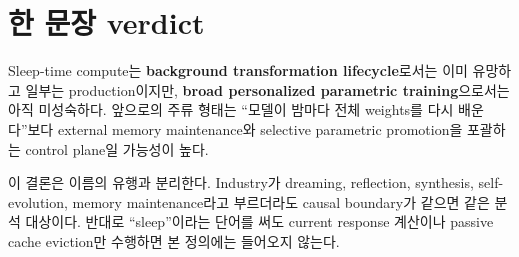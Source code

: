 \section{한 문장 verdict}

\begin{keypoint}
Sleep-time compute는 \textbf{background transformation lifecycle}로서는 이미 유망하고 일부는
production이지만, \textbf{broad personalized parametric training}으로서는 아직 미성숙하다. 앞으로의
주류 형태는 ``모델이 밤마다 전체 weights를 다시 배운다''보다 external memory maintenance와 selective
parametric promotion을 포괄하는 control plane일 가능성이 높다.
\end{keypoint}

이 결론은 이름의 유행과 분리한다. Industry가 dreaming, reflection, synthesis, self-evolution,
memory maintenance라고 부르더라도 causal boundary가 같으면 같은 분석 대상이다. 반대로 ``sleep''이라는
단어를 써도 current response 계산이나 passive cache eviction만 수행하면 본 정의에는 들어오지 않는다.
